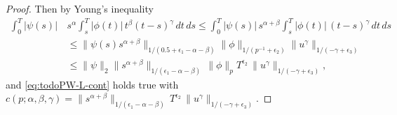 \documentclass{article}
\theoremstyle{plain}
\theoremstyle{remark}
\theoremstyle{definition}
\begin{document}
\begin{proof}
Then by Young's inequality
	\begin{align*}
		\int_0^T |\psi(s)|\, &s^\alpha
		\int_s^T |\phi(t)|\, t^\beta (t{-}s)^\gamma
		\, dt \, ds
 \le
		\int_0^T |\psi(s)|\, s^{\alpha+\beta}
		\int_s^T |\phi(t)|\, (t{-}s)^\gamma
		\, dt \, ds
\\ &\le
\|\psi(s) s^{\alpha+\beta}\|_{1/(0.5+\epsilon_1-\alpha-\beta)}
\|\phi\|_{1/(p^{-1}+\epsilon_2)}
\|u^\gamma\|_{1/(-\gamma+\epsilon_3)}
\\ &\le
\|\psi\|_2 \|s^{\alpha+\beta}\|_{1/(\epsilon_1-\alpha-\beta)} \,
\|\phi\|_p T^{\epsilon_2} \,
\|u^\gamma\|_{1/(-\gamma+\epsilon_3)},
\end{align*}
and \eqref{eq:todoPW-L-cont} holds true with
$c(p;\alpha,\beta,\gamma) =
\|s^{\alpha+\beta}\|_{1/(\epsilon_1-\alpha-\beta)} \,
T^{\epsilon_2} \,
\|u^\gamma\|_{1/(-\gamma+\epsilon_3)} .
$
	


\end{proof}
\end{document}
